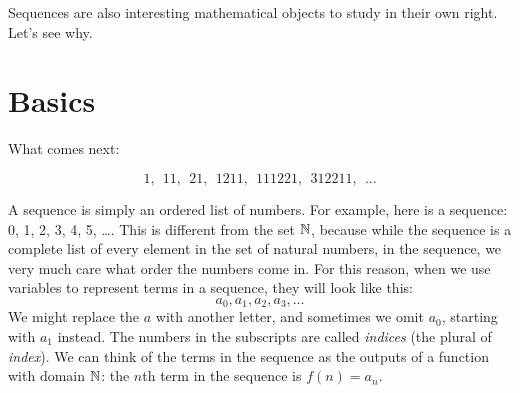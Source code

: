 \documentclass[12pt]{article}
\begin{document}
Sequences are also interesting mathematical objects to study in their own right. Let's see why.

\section{Basics}\label{sec:seq:basics}

\begin{activity}
What comes next:

\[1, ~~11, ~~21, ~~1211, ~~111221, ~~312211, ~~\ldots \]
\end{activity}

A sequence is simply an ordered list of numbers.  For example, here is a sequence: 0, 1, 2, 3, 4, 5, \ldots.  This is different from the set $\mathbb N$, because while the sequence is a complete list of every element in the set of natural numbers, in the sequence, we very much care what order the numbers come in.  For this reason, when we use variables to represent terms in a sequence, they will look like this:
\[a_0, a_1, a_2, a_3, \ldots\]
We might replace the $a$ with another letter, and sometimes we omit $a_0$, starting with $a_1$ instead.  The numbers in the subscripts are called {\em indices} (the plural of {\em index}).  We can think of the terms in the sequence as the outputs of a function with domain $\mathbb N$: the $n$th term in the sequence is $f(n) = a_n$.
\end{document}

